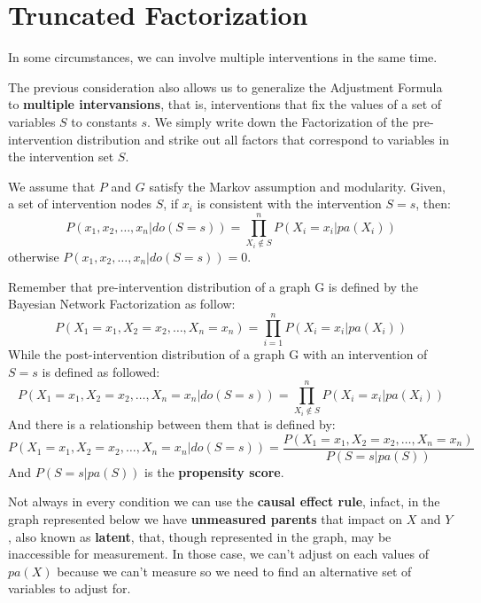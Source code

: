 \section{Truncated Factorization}
In some circumstances, we can involve multiple interventions in the same time.

The previous consideration also allows us to generalize the Adjustment Formula to
\textbf{multiple intervansions}, that is, interventions that fix the values of a
set of variables $S$ to constants $s$. We simply write down the Factorization of
the pre-intervention distribution and strike out all factors that correspond to
variables in the intervention set $S$.

\begin{definition}
      We assume that $P$ and $G$ satisfy the Markov assumption and modularity.
      Given, a set of intervention nodes $S$, if $x_i$ is consistent with the
      intervention $S = s$, then:
      \begin{equation}
            P(x_1, x_2, \dots, x_n| do(S = s)) = \prod_{X_i\not \in S}^{n} P(X_i = x_i | pa(X_i))
      \end{equation}
      otherwise $P(x_1, x_2, \dots, x_n| do(S = s)) = 0$.
\end{definition}

\begin{note}
      Remember that pre-intervention distribution of a graph G is defined by the
      Bayesian Network Factorization as follow:
      $$P(X_1 = x_1, X_2=x_2, \dots, X_n=x_n) = \prod_{i=1}^{n} P(X_i=x_i | pa(X_i))$$
      While the post-intervention distribution of a graph G with an intervention of
      $S=s$ is defined as followed:
      $$P(X_1 = x_1, X_2=x_2, \dots, X_n=x_n | do(S=s)) = \prod_{X_i\not \in S}^{n} P(X_i=x_i | pa(X_i))$$
      And there is a relationship between them that is defined by:
      $$P(X_1 = x_1, X_2=x_2, \dots, X_n=x_n | do(S=s)) = \frac{P(X_1 = x_1, X_2=x_2, \dots, X_n=x_n)}{P(S=s | pa(S))}$$
      And $P(S=s | pa(S))$ is the \textbf{propensity score}.
\end{note}

Not always in every condition we can use the \textbf{causal effect rule}, infact,
in the graph represented below we have \textbf{unmeasured parents} that impact on
$X$ and $Y$, also known as
\textbf{latent}, that, though represented in the graph, may be inaccessible for
measurement. In those case, we can't adjust on each values of $pa(X)$ because we
can't measure so we need to find an alternative set of variables to adjust for.


